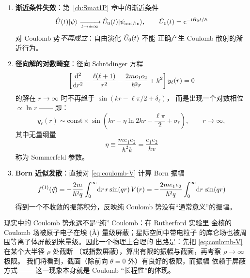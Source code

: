 \begin{enumerate}
  \item \textbf{渐近条件失效}：第~\ref{ch:Smat1P} 章中的渐近条件
  \begin{equation}
    \hat{U}(t)|\psi\rangle\xrightarrow[t\to\pm\infty]{}\hat{U}_0(t)|\psi_{\mathrm{out/in}}\rangle,
    \qquad \hat{U}_0(t)=\mathrm{e}^{-\mathrm{i} \hat{H}_0 t/\hbar}
    \label{eq:coulomb-asymp-fail}
  \end{equation}
  对 Coulomb 势\emph{不再成立}：自由演化 $\hat{U}_0(t)$ 不能
  正确产生 Coulomb 散射的渐近行为。

  \item \textbf{径向解的对数畸变}：径向 Schr\"odinger 方程
  \begin{equation}
    \left[\frac{\mathrm{d}^2}{\mathrm{d} r^2}-\frac{\ell(\ell+1)}{r^2}
      -\frac{2m e_1 e_2}{\hbar^2 r}+k^2\right]y_\ell(r)=0
    \label{eq:coulomb-radial}
  \end{equation}
  的解在 $r\to\infty$ 时不再趋于 $\sin(kr-\ell\pi/2+\delta_\ell)$，
  而是出现一个对数相位 $\propto \ln r$ —— 即：
  \begin{equation}
    y_\ell(r)\sim \mathrm{const}\times\sin\!\left(kr-\eta\ln 2kr-\frac{\ell\pi}{2}+\sigma_\ell\right),
    \qquad r\to\infty,
    \label{eq:coulomb-radial-asymp}
  \end{equation}
  其中无量纲量
  \begin{equation}
    \boxed{\;\eta\equiv\frac{m e_1 e_2}{\hbar^2 k}=\frac{e_1 e_2}{\hbar v}\;}
    \label{eq:coulomb-eta-def}
  \end{equation}
  称为 Sommerfeld 参数。

  \item \textbf{Born 近似发散}：直接对 \eqref{eq:coulomb-V} 计算 Born 振幅
  \begin{equation}
    f^{(1)}(\vec q)=-\frac{2m}{\hbar^2 q}\int_0^\infty\!\mathrm{d} r\, r\sin(qr)\,V(r)
                 =-\frac{2m e_1 e_2}{\hbar^2 q}\int_0^\infty\!\mathrm{d} r\,\sin(qr)
    \label{eq:coulomb-born-divergent}
  \end{equation}
  得到一个不收敛的振荡积分，反映纯 Coulomb 势没有``通常意义''的振幅。
\end{enumerate}

\begin{remark}[物理上的处方]
现实中的 Coulomb 势永远不是``纯'' Coulomb：在 Rutherford 实验里
金核的 Coulomb 场被原子电子在埃 (\AA) 量级屏蔽；星际空间中带电粒子
的库仑场也被周围等离子体屏蔽到米量级。因此一个物理上合理的
出路是：先把 \eqref{eq:coulomb-V} 在某个大半径 $\rho$ 处截断
（或指数屏蔽），算出有限的振幅与截面，再考察 $\rho\to\infty$ 极限。
我们将看到，截面（除前向 $\theta=0$ 外）有良好的极限，而振幅
依赖于屏蔽方式 —— 这一现象本身就是 Coulomb ``长程性''的体现。
\end{remark}

